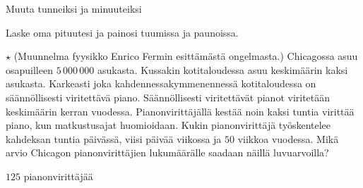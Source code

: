 \begin{tehtavasivu}
\begin{tehtava}
Muuta tunneiksi ja minuuteiksi
\begin{vastaus}
\end{vastaus}
\end{tehtava}

\begin{tehtava}
Laske oma pituutesi ja painosi tuumissa ja paunoissa. %
\end{tehtava}

\begin{tehtava}
$\star$ (Muunnelma fyysikko Enrico Fermin esittämästä ongelmasta.) Chicagossa asuu osapuilleen $5\,000\,000$ asukasta. Kussakin kotitaloudessa asuu keskimäärin kaksi asukasta. Karkeasti joka kahdennessakymmenennessä kotitaloudessa on säännöllisesti viritettävä piano. Säännöllisesti viritettävät pianot viritetään keskimäärin kerran vuodessa. Pianonvirittäjällä kestää noin kaksi tuntia virittää piano, kun matkustusajat huomioidaan. Kukin pianonvirittäjä työskentelee kahdeksan tuntia päivässä, viisi päivää viikossa ja $50$ viikkoa vuodessa. Mikä arvio Chicagon pianonvirittäjien lukumäärälle saadaan näillä luvuarvoilla?
\begin{vastaus}
$125$ pianonvirittäjää
\end{vastaus}
\end{tehtava}

\end{tehtavasivu}